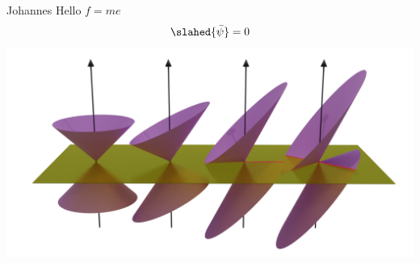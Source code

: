 \documentclass{beamer}
\begin{document}
\begin{frame}{Johannes}
 Hello \( f = me \)
 \[
\slahed{\bar{\psi}} = 0
\]
\includegraphics[width=.5\textwidth]{cones-tilt-color1}
\end{frame}
\end{document}
